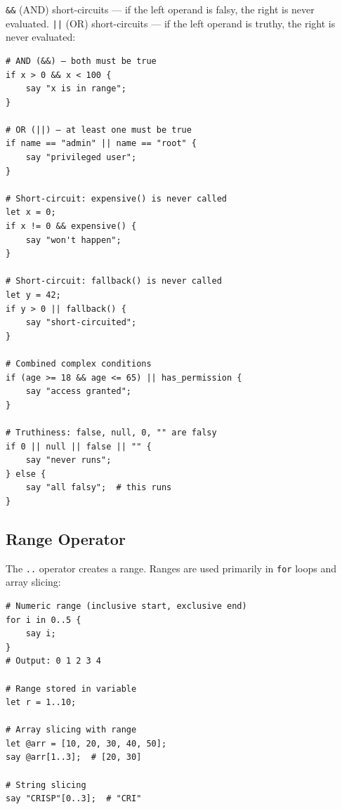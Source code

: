 \texttt{\&\&} (AND) short-circuits — if the left operand is falsy, the right is never evaluated. \texttt{||} (OR) short-circuits — if the left operand is truthy, the right is never evaluated:

\begin{tcolorbox}[colback=codebg, colframe=darkpurple, colbacktitle=darkpurple, title=\textbf{\textcolor{codegold}{Logical Operators}}, fonttitle=\bfseries, sharp corners]
\begin{lstlisting}
# AND (&&) — both must be true
if x > 0 && x < 100 {
    say "x is in range";
}

# OR (||) — at least one must be true
if name == "admin" || name == "root" {
    say "privileged user";
}

# Short-circuit: expensive() is never called
let x = 0;
if x != 0 && expensive() {
    say "won't happen";
}

# Short-circuit: fallback() is never called
let y = 42;
if y > 0 || fallback() {
    say "short-circuited";
}

# Combined complex conditions
if (age >= 18 && age <= 65) || has_permission {
    say "access granted";
}

# Truthiness: false, null, 0, "" are falsy
if 0 || null || false || "" {
    say "never runs";
} else {
    say "all falsy";  # this runs
}
\end{lstlisting}
\end{tcolorbox}

\subsection{Range Operator}

The \texttt{..} operator creates a range. Ranges are used primarily in \texttt{for} loops and array slicing:

\begin{tcolorbox}[colback=codebg, colframe=darkpurple, colbacktitle=darkpurple, title=\textbf{\textcolor{codegold}{Range Operator}}, fonttitle=\bfseries, sharp corners]
\begin{lstlisting}
# Numeric range (inclusive start, exclusive end)
for i in 0..5 {
    say i;
}
# Output: 0 1 2 3 4

# Range stored in variable
let r = 1..10;

# Array slicing with range
let @arr = [10, 20, 30, 40, 50];
say @arr[1..3];  # [20, 30]

# String slicing
say "CRISP"[0..3];  # "CRI"
\end{lstlisting}
\end{tcolorbox}


